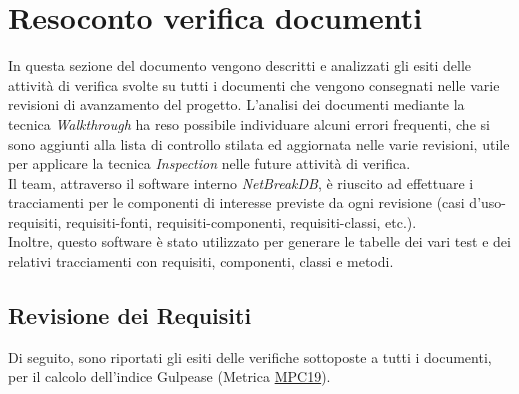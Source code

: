 \newpage
\section{Resoconto verifica documenti}

In questa sezione del documento vengono descritti e analizzati gli esiti delle attività di verifica svolte su tutti i documenti che vengono consegnati nelle varie revisioni di avanzamento del progetto.
L’analisi dei documenti mediante la tecnica \textit{Walkthrough} ha reso possibile individuare alcuni errori frequenti, che si sono aggiunti alla lista di controllo stilata ed aggiornata nelle varie revisioni, utile per applicare la tecnica \textit{Inspection} nelle future attività di verifica.\\
Il team, attraverso il software interno \textit{NetBreakDB}, è riuscito ad effettuare i tracciamenti per le componenti di interesse previste da ogni revisione (casi d’uso-requisiti, requisiti-fonti, requisiti-componenti, requisiti-classi, etc.).\\
Inoltre, questo software è stato utilizzato per generare le tabelle dei vari test e dei relativi tracciamenti con requisiti, componenti, classi e metodi.
	
	\subsection{Revisione dei Requisiti}
	Di seguito, sono riportati gli esiti delle verifiche sottoposte a tutti i documenti, per il calcolo dell’indice Gulpease (Metrica \hyperlink{MPC19}{MPC19}).
	
